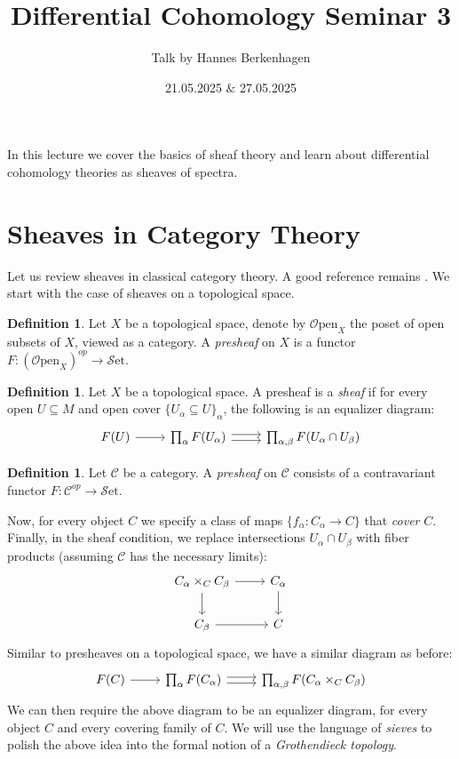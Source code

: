 \documentclass[10pt]{amsart}
\title{Differential Cohomology Seminar 3}
\date{21.05.2025 $\&$ 27.05.2025}
\author{Talk by Hannes Berkenhagen}
\newcommand{\C}{\mathscr{C}}
\newcommand{\set}{\mathscr{S}\mathrm{et}}
\newcommand{\Open}{\mathscr{O}\mathrm{pen}}
\theoremstyle{definition}
\newtheorem{definition}[equation]{Definition}
\theoremstyle{remark}
\numberwithin{equation}{section}
\begin{document}
\maketitle

	\maketitle
	
	In this lecture we cover the basics of sheaf theory and learn about differential cohomology theories as sheaves of spectra. 
	
	\section{Sheaves in Category Theory}
	Let us review sheaves in classical category theory. A good reference remains \cite{maclanemoerdijk1994topos}. We start with  the case of sheaves on a topological space. 
	\begin{definition}
		Let $X$ be a topological space, denote by $\Open_X$ the poset of open subsets of $X$, viewed as a category. A \emph{presheaf} on $X$ is a functor $F:(\Open_X)^{op}\to\set$. 
	\end{definition}
	
	\begin{definition}
		Let $X$ be a topological space. A presheaf is a \emph{sheaf} if for every open $U\subseteq M$ and open cover $\{U_\alpha\subseteq U\}_{\alpha}$, the following is an equalizer diagram:
		\[
		\begin{tikzcd}
			F(U) \arrow[r] & \prod_\alpha F(U_\alpha) \arrow[r, shift left=1] \arrow[r, shift right = 1] &   \prod_{\alpha,\beta} F(U_\alpha \cap U_\beta) 
		\end{tikzcd}
		\]
	\end{definition}
	\begin{definition}
		Let $\C$ be a category. A \emph{presheaf} on $\C$ consists of a contravariant functor $F\colon\C^{op}\to\set$. 
	\end{definition}
	Now, for every object $C$ we specify a class of maps $\{f_\alpha:C_\alpha\to C\}$ that \emph{cover} $C$. Finally, in the sheaf condition, we replace intersections $U_\alpha\cap U_\beta$ with fiber products (assuming $\C$ has the necessary limits):
	\[
	\begin{tikzcd} 
		C_\alpha \times_{C} C_\beta \arrow[r] \arrow[d] & C_\alpha \arrow[d] \\
		C_\beta\arrow[r] & C
	\end{tikzcd}
	\]
	Similar to presheaves on a topological space, we have a similar diagram as before:\[
		\begin{tikzcd}
			F(C) \arrow[r] & \prod_\alpha F(C_\alpha) \arrow[r, shift left=1] \arrow[r, shift right = 1] &   \prod_{\alpha,\beta} F(C_\alpha \times_C C_\beta) 
		\end{tikzcd}
		\]
	We can then require the above diagram to be an equalizer diagram, for every object $C$ and every covering family of $C$. We will use the language of \emph{sieves} to polish the above idea into the formal notion of a \emph{Grothendieck topology}. 
	
\end{document}
